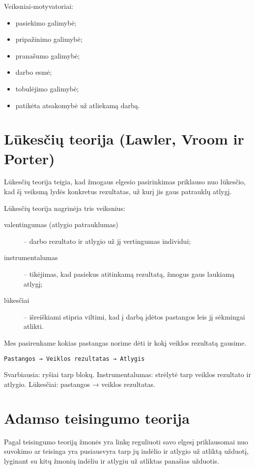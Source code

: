 Veiksniai-motyvatoriai:
\begin{itemize}
  \item pasiekimo galimybė;
  \item pripažinimo galimybė;
  \item pranašumo galimybė;
  \item darbo esmė;
  \item tobulėjimo galimybė;
  \item patikėta atsakomybė už atliekamą darbą.
\end{itemize}

\section{Lūkesčių teorija (Lawler, Vroom ir Porter)}

Lūkesčių teorija teigia, kad žmogaus elgesio pasirinkimas priklauso nuo
lūkesčio, kad šį veiksmą lydės konkretus rezultatas, už kurį jis
gaus patrauklų atlygį.

Lūkesčių teorija nagrinėja tris veiksnius:
\begin{description}
  \item[valentingumas (atlygio patrauklumas)] – darbo rezultato ir
    atlygio už jį vertingumas individui;
  \item[instrumentalumas] – tikėjimas, kad pasiekus atitinkamą rezultatą,
    žmogus gaus laukiamą atlygį;
  \item[lūkesčiai] – išreiškiami stipria viltimi, kad į darbą įdėtos
    pastangos leis jį sėkmingai atlikti.
\end{description}

Mes pasirenkame kokias pastangas norime dėti ir kokį veiklos rezultatą
gausime.

\begin{verbatim}
Pastangos → Veiklos rezultatas → Atlygis
\end{verbatim}

Svarbiausia: ryšiai tarp blokų. Instrumentalumas: strėlytė tarp veiklos
rezultato ir atlygio. Lūkesčiai: pastangos → veiklos rezultatas.

\section{Adamso teisingumo teorija}

Pagal teisingumo teoriją žmonės yra linkę reguliuoti savo elgesį
priklausomai nuo suvokimo ar teisinga yra pusiausvyra tarp jų indėlio
ir atlygio už atliktą užduotį, lyginant su kitų žmonių indėliu ir
atlygiu už atliktas panašias užduotis.

